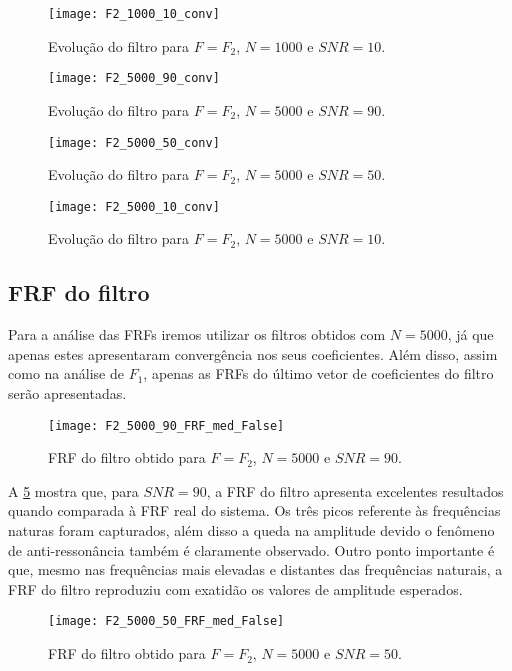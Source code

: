 \begin{figure}
	\centering
	\texttt{[image: F2\_1000\_10\_conv]}
	\caption{Evolução do filtro para $ F=F_2 $, $ N=1000 $ e $ SNR=10 $.}
	\label{fig:F2_1000_10_conv}
\end{figure}

\begin{figure}
	\centering
	\texttt{[image: F2\_5000\_90\_conv]}
	\caption{Evolução do filtro para $ F=F_2 $, $ N=5000 $ e $ SNR=90 $.}
	\label{fig:F2_5000_90_conv}
\end{figure}

\begin{figure}
	\centering
	\texttt{[image: F2\_5000\_50\_conv]}
	\caption{Evolução do filtro para $ F=F_2 $, $ N=5000 $ e $ SNR=50 $.}
	\label{fig:F2_5000_50_conv}
\end{figure}

\begin{figure}
	\centering
	\texttt{[image: F2\_5000\_10\_conv]}
	\caption{Evolução do filtro para $ F=F_2 $, $ N=5000 $ e $ SNR=10 $.}
	\label{fig:F2_5000_10_conv}
\end{figure}

\subsection{FRF do filtro}
Para a análise das FRFs iremos utilizar os filtros obtidos com $ N=5000 $, já que apenas estes apresentaram convergência nos seus coeficientes. Além disso, assim como na análise de $ F_1 $, apenas as FRFs do último vetor de coeficientes do filtro serão apresentadas.

\begin{figure}
	\centering
	\texttt{[image: F2\_5000\_90\_FRF\_med\_False]}
	\caption{FRF do filtro obtido para $ F=F_2 $, $ N=5000 $ e $ SNR=90 $.}
	\label{fig:F2_5000_90_FRF_med_False}
\end{figure}

A \cref{fig:F2_5000_90_FRF_med_False} mostra que, para $ SNR=90 $, a FRF do filtro apresenta excelentes resultados quando comparada à FRF real do sistema. Os três picos referente às frequências naturas foram capturados, além disso a queda na amplitude devido o fenômeno de anti-ressonância também é claramente observado. Outro ponto importante é que, mesmo nas frequências mais elevadas e distantes das frequências naturais, a FRF do filtro reproduziu com exatidão os valores de amplitude esperados.

\begin{figure}
	\centering
	\texttt{[image: F2\_5000\_50\_FRF\_med\_False]}
	\caption{FRF do filtro obtido para $ F=F_2 $, $ N=5000 $ e $ SNR=50 $.}
	\label{fig:F2_5000_50_FRF_med_False}
\end{figure}

